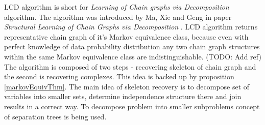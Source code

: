%
%

LCD algorithm is short for \textit{Learning of Chain graphs via Decomposition} algorithm. The algorithm was introduced by Ma, Xie and Geng in paper \textit{Structural Learning of Chain Graphs via Decomposition} \cite{CG}. LCD algorithm returns 
representative chain graph of it's Markov equivalence class, because even with perfect knowledge of data probability
distribution any two chain graph structures within the same Markov equivalence class are indistinguishable. (TODO: Add ref)
The algorithm is composed of two steps - recovering skeleton of chain graph and the second is recovering complexes. This
idea is backed up by proposition \ref{markovEquivThm}. 
The main idea of skeleton recovery is to decompose set of variables into smaller sets, determine independence structure there and join results in a correct way. To decompose problem into smaller subproblems concept of 
separation trees is being used.


